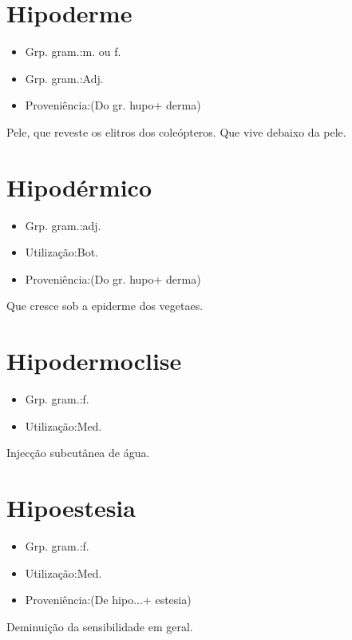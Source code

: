\documentclass{article}
\begin{document}
\section{Hipoderme}
\begin{itemize}
\item {Grp. gram.:m.  ou  f.}
\end{itemize}
\begin{itemize}
\item {Grp. gram.:Adj.}
\end{itemize}
\begin{itemize}
\item {Proveniência:(Do gr. \textunderscore hupo\textunderscore  + \textunderscore derma\textunderscore )}
\end{itemize}
Pele, que reveste os elitros dos coleópteros.
Que vive debaixo da pele.
\section{Hipodérmico}
\begin{itemize}
\item {Grp. gram.:adj.}
\end{itemize}
\begin{itemize}
\item {Utilização:Bot.}
\end{itemize}
\begin{itemize}
\item {Proveniência:(Do gr. \textunderscore hupo\textunderscore  + \textunderscore derma\textunderscore )}
\end{itemize}
Que cresce sob a epiderme dos vegetaes.
\section{Hipodermoclise}
\begin{itemize}
\item {Grp. gram.:f.}
\end{itemize}
\begin{itemize}
\item {Utilização:Med.}
\end{itemize}
Injecção subcutânea de água.
\section{Hipoestesia}
\begin{itemize}
\item {Grp. gram.:f.}
\end{itemize}
\begin{itemize}
\item {Utilização:Med.}
\end{itemize}
\begin{itemize}
\item {Proveniência:(De \textunderscore hipo...\textunderscore  + \textunderscore estesia\textunderscore )}
\end{itemize}
Deminuição da sensibilidade em geral.
\end{document}
